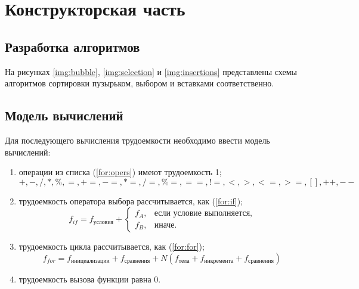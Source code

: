 \chapter{Конструкторская часть}

\section{Разработка алгоритмов}

На рисунках \ref{img:bubble}, \ref{img:selection} и \ref{img:insertions} представлены схемы алгоритмов сортировки пузырьком, выбором и вставками соответственно.

\clearpage
{}

\section{Модель вычислений}

Для последующего вычисления трудоемкости необходимо ввести модель вычислений:
\begin{enumerate}
    \item операции из списка (\ref{for:opers}) имеют трудоемкость 1;
        \begin{equation}
            \label{for:opers}
            +, -, /, *, \%, =, +=, -=, *=, /=, \%=, ==, !=, <, >, <=, >=, [], ++, {-}-
        \end{equation}
    \item трудоемкость оператора выбора  рассчитывается, как (\ref{for:if});
	\begin{equation}
        \label{for:if}
        f_{if} = f_{\text{условия}} +
        \begin{cases}
        f_A, & \text{если условие выполняется,}\\
        f_B, & \text{иначе.}
        \end{cases}
	\end{equation}
\item трудоемкость цикла рассчитывается, как (\ref{for:for});
    \begin{equation}
        \label{for:for}
        f_{for} = f_{\text{инициализации}} + f_{\text{сравнения}} + N(f_{\text{тела}} + f_{\text{инкремента}} + f_{\text{сравнения}})
    \end{equation}
	\item трудоемкость вызова функции равна 0.
\end{enumerate}


